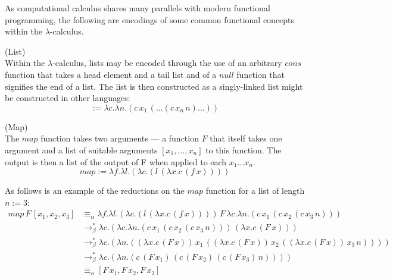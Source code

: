 \documentclass{article}
\begin{document}
        As computational calculus shares many parallels with modern functional programming, the following are encodings of some common functional concepts within the $\lambda$-calculus.

        \begin{definition}{(List)\\}
            Within the $\lambda$-calculus, lists may be encoded through the use of an arbitrary ${cons}$ function that takes a head element and a tail list and of a ${null}$ function that signifies the end of a list.
            The list is then constructed as a singly-linked list might be constructed in other languages:
            \begin{equation}
                [x_1, \ldots, x_n] := \lambda c . \lambda n . (c \, x_1 \, (\ldots (c \, x_n \, n) \ldots) )
            \end{equation}
        \end{definition}


        \begin{definition}{(Map)\\}
            The $map$ function takes two arguments --- a function $F$ that itself takes one argument and a list of suitable arguments $[x_1, \ldots, x_n]$ to this function.
            The output is then a list of the output of F when applied to each $x_1 \ldots x_n$.
            \begin{equation}
                {map} := \lambda f . \lambda l . (\lambda c . (l \, (\lambda x . c \, (f \, x))))
            \end{equation}
        \end{definition}


        \begin{example*}
            As follows is an example of the reductions on the ${map}$ function for a list of length $n := 3$:
            \begin{align*}
                {map} \, F \, [x_1, x_2, x_3]
                      & \equiv_{\alpha} \lambda f . \lambda l . (\lambda c . (l \, (\lambda x . c \, (f \, x)))) \, F \, \lambda c . \lambda n . (c \, x_1 \, (c \, x_2 \, (c \, x_3 \, n))) \\
                      & \rightarrow_\beta^* \lambda c . (\lambda c . \lambda n . (c \, x_1 \, (c \, x_2 \, (c \, x_3 \, n))) \, (\lambda x . c \, (F \, x))) \\
                      & \rightarrow_\beta^* \lambda c . (\lambda n . ((\lambda x . c \, (F \, x)) \, x_1 \, ((\lambda x . c \, (F \, x)) \, x_2 \, ((\lambda x . c \, (F \, x)) \, x_3 \, n)))) \\
                      & \rightarrow_\beta^* \lambda c . (\lambda n . (c \, (F \, x_1) \, (c \, (F \, x_2) \, (c \, (F \, x_3) \, n)))) \\
                      & \equiv_{\alpha} [F \, x_1, F \, x_2, F \, x_3]
            \end{align*}
        \end{example*}
\end{document}
